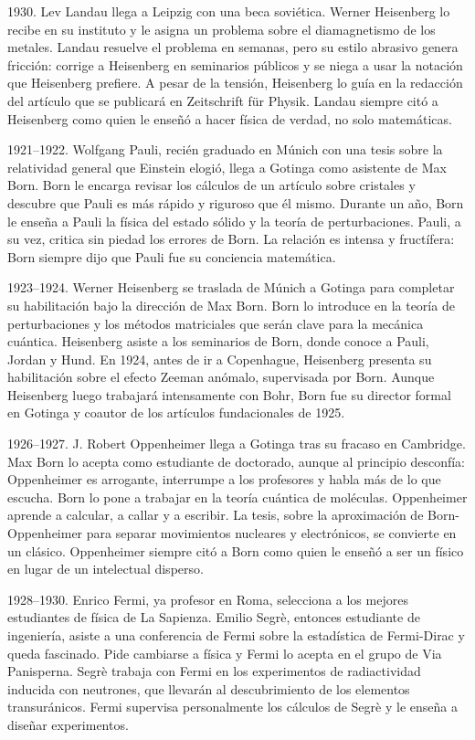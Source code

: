 \documentclass[11pt,a4paper]{article}
\begin{document}
1930. Lev Landau llega a Leipzig con una beca soviética. Werner Heisenberg lo recibe en su instituto y le asigna un problema sobre el diamagnetismo de los metales. Landau resuelve el problema en semanas, pero su estilo abrasivo genera fricción: corrige a Heisenberg en seminarios públicos y se niega a usar la notación que Heisenberg prefiere. A pesar de la tensión, Heisenberg lo guía en la redacción del artículo que se publicará en Zeitschrift für Physik. Landau siempre citó a Heisenberg como quien le enseñó a hacer física de verdad, no solo matemáticas.

1921--1922. Wolfgang Pauli, recién graduado en Múnich con una tesis sobre la relatividad general que Einstein elogió, llega a Gotinga como asistente de Max Born. Born le encarga revisar los cálculos de un artículo sobre cristales y descubre que Pauli es más rápido y riguroso que él mismo. Durante un año, Born le enseña a Pauli la física del estado sólido y la teoría de perturbaciones. Pauli, a su vez, critica sin piedad los errores de Born. La relación es intensa y fructífera: Born siempre dijo que Pauli fue su conciencia matemática.

1923--1924. Werner Heisenberg se traslada de Múnich a Gotinga para completar su habilitación bajo la dirección de Max Born. Born lo introduce en la teoría de perturbaciones y los métodos matriciales que serán clave para la mecánica cuántica. Heisenberg asiste a los seminarios de Born, donde conoce a Pauli, Jordan y Hund. En 1924, antes de ir a Copenhague, Heisenberg presenta su habilitación sobre el efecto Zeeman anómalo, supervisada por Born. Aunque Heisenberg luego trabajará intensamente con Bohr, Born fue su director formal en Gotinga y coautor de los artículos fundacionales de 1925.

1926--1927. J. Robert Oppenheimer llega a Gotinga tras su fracaso en Cambridge. Max Born lo acepta como estudiante de doctorado, aunque al principio desconfía: Oppenheimer es arrogante, interrumpe a los profesores y habla más de lo que escucha. Born lo pone a trabajar en la teoría cuántica de moléculas. Oppenheimer aprende a calcular, a callar y a escribir. La tesis, sobre la aproximación de Born-Oppenheimer para separar movimientos nucleares y electrónicos, se convierte en un clásico. Oppenheimer siempre citó a Born como quien le enseñó a ser un físico en lugar de un intelectual disperso.

1928--1930. Enrico Fermi, ya profesor en Roma, selecciona a los mejores estudiantes de física de La Sapienza. Emilio Segrè, entonces estudiante de ingeniería, asiste a una conferencia de Fermi sobre la estadística de Fermi-Dirac y queda fascinado. Pide cambiarse a física y Fermi lo acepta en el grupo de Via Panisperna. Segrè trabaja con Fermi en los experimentos de radiactividad inducida con neutrones, que llevarán al descubrimiento de los elementos transuránicos. Fermi supervisa personalmente los cálculos de Segrè y le enseña a diseñar experimentos.
\end{document}
